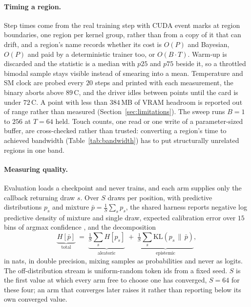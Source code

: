 \paragraph{Timing a region.}
Step times come from the real training step with CUDA event marks at region
boundaries, one region per kernel group, rather than from a copy of it that can drift,
and a region's name records whether its cost is $O(P)$ and Bayesian, $O(P)$ and paid
by a deterministic trainer too, or $O(B \cdot T)$. Warm-up is discarded and the
statistic is a median with $p25$ and $p75$ beside it, so a throttled bimodal sample
stays visible instead of smearing into a mean. Temperature and SM clock are probed
every $20$ steps and printed with each measurement, the binary aborts above
$89$\,\textdegree C, and the driver idles between points until the card is under
$72$\,\textdegree C. A point with less than $384$\,MB of VRAM headroom is reported out
of range rather than measured (Section~\ref{sec:limitations}). The sweep runs $B = 1$
to $256$ at $T = 64$ held. Touch counts, one read or one write of a parameter-sized
buffer, are cross-checked rather than trusted: converting a region's time to achieved
bandwidth (Table~\ref{tab:bandwidth}) has to put structurally unrelated regions in one
band.

\begin{table}[t]
  \centering
  \small
  
  \caption{Every parameter-sized region of the mean-field step, touches counted at the
  launch sites and converted at $P \cdot 4$ bytes each. The aggregate row is the sum of
  the rows above it; \texttt{*fused\_step} is the same work after folding.}
  \label{tab:bandwidth}
\end{table}

\paragraph{Measuring quality.}
Evaluation loads a checkpoint and never trains, and each arm supplies only the
callback returning draw $s$. Over $S$ draws per position, with predictive
distributions $p_s$ and mixture $\bar{p} = \frac{1}{S}\sum_s p_s$, the shared harness
reports negative log predictive density of mixture and single draw, expected
calibration error over $15$ bins of argmax confidence \citep{guo2017calibration}, and
the decomposition \citep{kendall2017uncertainties}
\begin{equation}
  \underbrace{H[\bar{p}]}_{\text{total}}
  \;=\;
  \underbrace{\tfrac{1}{S}\textstyle\sum_s H[p_s]}_{\text{aleatoric}}
  \;+\;
  \underbrace{\tfrac{1}{S}\textstyle\sum_s \mathrm{KL}(p_s \,\|\, \bar{p})}_{\text{epistemic}} ,
  \label{eq:decomp}
\end{equation}
in nats, in double precision, mixing samples as probabilities and never as logits.
The off-distribution stream is uniform-random token ids from a fixed seed. $S$ is the
first value at which every arm free to choose one has converged, $S = 64$ for these
four; an arm that converges later raises it rather than reporting below its own
converged value.

